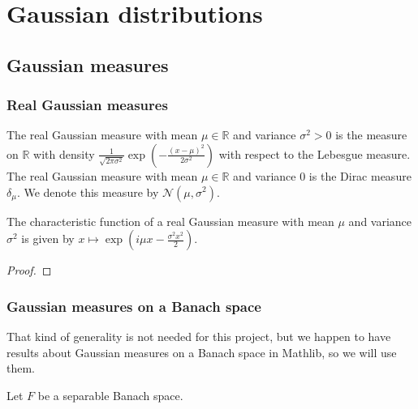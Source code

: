 \chapter{Gaussian distributions}
\label{chap:gaussian}

\section{Gaussian measures}
\label{sec:gaussian_measures}

\subsection{Real Gaussian measures}

\begin{definition}\label{def:gaussianReal}
  \mathlibok
  The real Gaussian measure with mean $\mu \in \mathbb{R}$ and variance $\sigma^2 > 0$ is the measure on $\mathbb{R}$ with density $\frac{1}{\sqrt{2 \pi \sigma^2}} \exp\left(-\frac{(x - \mu)^2}{2 \sigma^2}\right)$ with respect to the Lebesgue measure.
  The real Gaussian measure with mean $\mu \in \mathbb{R}$ and variance $0$ is the Dirac measure $\delta_\mu$.
  We denote this measure by $\mathcal{N}(\mu, \sigma^2)$.
\end{definition}


\begin{lemma}\label{lem:charFun_gaussianReal}
  \mathlibok
The characteristic function of a real Gaussian measure with mean $\mu$ and variance $\sigma^2$ is given by
$x \mapsto \exp\left(i \mu x - \frac{\sigma^2 x^2}{2}\right)$.
\end{lemma}

\begin{proof}\leanok

\end{proof}


\subsection{Gaussian measures on a Banach space}

That kind of generality is not needed for this project, but we happen to have results about Gaussian measures on a Banach space in Mathlib, so we will use them.

Let $F$ be a separable Banach space.

